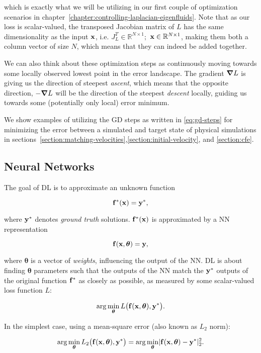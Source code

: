 which is exactly what we will be utilizing in our first couple of optimization
scenarios in chapter~\ref{chapter:controlling-laplacian-eigenfluids}. Note that
as our loss is scalar-valued, the transposed Jacobian matrix of $L$ has the same
dimensionality as the input $\vb{x}$, i.e. $J_{L}^T \in \mathbb{R}^{N\times 1};$
$\vb{x} \in \mathbb{R}^{N\times 1}$, making them both a column vector of size
$N$, which means that they can indeed be added together. 

We can also think about these optimization steps as continuously moving towards
some locally observed lowest point in the error landscape. The gradient
$\grad{L}$ is giving us the direction of steepest \textit{ascent}, which means
that the opposite direction, $-\grad{L}$ will be the direction of the steepest
\textit{descent} locally, guiding us towards some (potentially only local) error
minimum.

We show examples of utilizing the \ac{GD} steps as written in
\eqref{eq:gd-steps} for minimizing the error between a simulated and target
state of physical simulations in
sections~\ref{section:matching-velocities},\ref{section:initial-velocity}, and
\ref{section:cfe}.

\subsection{Neural Networks}\label{section:neural-networks}
The goal of \acf{DL} is to approximate an unknown function 

$$\vb{f}^*(\vb{x}) = \vb{y}^*,$$

where $\vb{y}^*$ denotes \textit{ground truth} solutions. $\vb{f}^*(\vb{x})$ is
approximated by a \acf{NN} representation 

$$\vb{f}(\vb{x}, \boldsymbol\theta) = \vb{y},$$

where $\boldsymbol{\theta}$ is a vector of \textit{weights}, influencing the output of
the \ac{NN}. \ac{DL} is about finding $\boldsymbol{\theta}$ parameters such
that the outputs of the \ac{NN} match the $\vb{y}^*$ outputs of the original
function $\vb{f}^*$ as closely as possible, as measured by some scalar-valued
loss function $L$:

$$\arg\min_{\boldsymbol\theta} L\big(\vb{f}(\vb{x}, \boldsymbol\theta), \vb{y}^*
    \big).$$

In the simplest case, using a mean-square error (also known as $L_2$
norm):

\begin{equation}\label{eq:NN-min}
    \arg\min_{\boldsymbol\theta} 
        L_2\big(\vb{f}(\vb{x}, \boldsymbol\theta), \vb{y}^* \big) 
    = \arg\min_{\boldsymbol\theta} 
        \lvert \vb{f}(\vb{x}, \boldsymbol\theta) - \vb{y}^* \rvert_2^2.
\end{equation}

